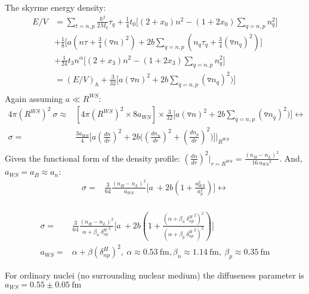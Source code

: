 \documentclass[11pt,letter]{article}
\begin{document}
The skyrme energy density:
\begin{equation}
 \begin{split}
  E/V &= \sum_{t=n,p}\frac{\hbar^2}{2M_q}\tau_q+\frac{1}{4}t_0\Big[(2+x_0)n^2-(1+2x_0)\sum_{q=n,p} n^2_q\Big]\\
  &+\frac{1}{8}\Big[ a (n \tau+\frac{3}{4}(\triangledown n)^2)+2b\sum_{q=n,p}(n_q \tau_q+\frac{3}{4}(\triangledown n_q)^2)\Big]\\
  &+\frac{1}{24}t_3n^{\alpha}\Big[(2+x_3)n^2-(1+2x_3)\sum_{q=n,p}n_q^2\Big]\\
  &=(E/V)_{h}+\frac{3}{32}\Big[ a (\triangledown n)^2+2b\sum_{q=n,p}(\triangledown n_q)^2)\Big]\\
 \end{split}
\end{equation}
Again assuming $a\ll R^{WS}$:
\begin{equation}
 \begin{split}
  4\pi (R^{WS})^2\ \sigma \approx& [4\pi (R^{WS})^2\times 8a_{WS}] \times   \frac{3}{32}\Big[ a (\triangledown n)^2+2b\sum_{q=n,p}(\triangledown n_q)^2)\Big] \leftrightarrow \\
\sigma =& \frac{3a_{WS}}{4} \Big[a (\frac{dn}{dr})^2 +2 b \big( (\frac{dn_n}{dr})^2+(\frac{dn_p}{dr})^2\big) \Big]\bigg |_{R^{WS}}\\ 
 \end{split}
\end{equation}
Given the functional form of the density profile: $(\frac{dn}{dr})^2 \bigg|_{r=R^{WS}} = \frac{(n_H-n_L)^2}{16\ {a_{WS}}^2}$.
And, $a_{WS}=a_B \approx a_n$:
\begin{equation}
 \begin{split}
  \sigma =& \frac{3}{64} \frac{(n_H-n_L)^2}{a_{WS}}  \big[a\  +2 b ( 1+\frac{a_{WS}^2}{a_p^2})\big]\leftrightarrow \\
 \end{split}
\end{equation}

\begin{mdframed}
\begin{equation*}
  \begin{split}
  \sigma=&\frac{3}{64} \frac{(n_H-n_L)^2}{\alpha+\beta_n \ {\delta^H_{np}}^2} \big[a\  +2 b ( 1+\frac{(\alpha+\beta_n \ {\delta^H_{np}}^2)^2}{(\alpha+\beta_p \ {\delta^H_{np}}^2)^2})\big]\\
  a_{WS} =& \alpha + \beta (\delta^{H}_{np})^2,\ \alpha \approx 0.53\ \text{fm}, \beta_n \approx 1.14\ \text{fm},\ \beta_p \approx 0.35\ \text{fm} 
  \end{split}
 \end{equation*}
\end{mdframed}
For ordinary nuclei (no surrounding nuclear medium) the diffuseness parameter is $a_{WS} = 0.55 \pm 0.05 \ \text{fm}$ 
\end{document}
